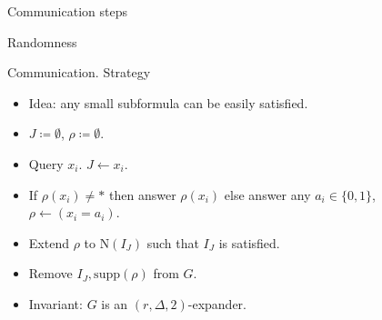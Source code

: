 \begin{frame}{Communication steps}
    
\end{frame}

\begin{frame}{Randomness}


\end{frame}


\begin{frame}{Communication. Strategy}

    \begin{itemize}
        \item Idea: any small subformula can be easily satisfied.
    \end{itemize}

    \pause
    \vspace{0.5cm}

    \begin{itemize}
        \item $J \coloneqq \emptyset$, $\rho \coloneqq \emptyset$.
            \pause
        \item Query $x_i$. $J \gets x_i$.
            \pause
        \item If $\rho(x_i) \neq *$ then answer $\rho(x_i)$ else
            answer any $a_i \in \{0, 1\}$, $\rho \gets (x_i = a_i)$.
            \pause
        \item Extend $\rho$ to $\mathrm{N}(I_J)$ such that $I_J$ is
            satisfied.
        \item Remove $I_J, \mathrm{supp}(\rho)$ from $G$.
    \end{itemize}

    \pause
    \vspace{0.5cm}
    \begin{itemize}
        \item Invariant: $G$ is an $(r, \Delta, 2)$-expander.
    \end{itemize}

\end{frame}
